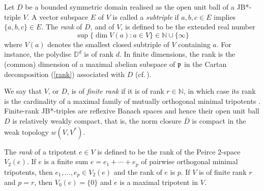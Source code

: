 \documentclass[12pt, twoside]{article}
\theoremstyle{definition}
\numberwithin{equation}{section}
\begin{document}
Let $D$ be a bounded symmetric domain realised as the open unit ball of a JB*-triple $V$.
A vector subspace  $E$ of $V$ is called a {\it subtriple} if $a,b,c \in E$ implies
$\{a,b,c\} \in E$. The {\it rank} of $D$,
and of $V$, is defined to be the extended real number
$$\sup\{ \dim V(a): a\in V\} \in \mathbb{N}\cup \{\infty\}$$
where $V(a)$ denotes the smallest closed subtriple of $V$ containing $a$.
For instance, the polydisc $\mathbb{D}^d$ is of rank $d$.
In finite dimensions,
the rank is the (common) dimension of a maximal abelian subspace of $\frak p$ in the Cartan decomposition
(\ref{rank}) associated with $D$ (cf.\,\cite[p.\,185]{book2}).

We say that $V$, or $D$, is of {\it finite rank} if it is of rank $r \in \mathbb{N}$, in which case its rank is the cardinality of a maximal  family of
mutually orthogonal minimal tripotents \cite[p.\,187]{book2}. Finite-rank JB*-triples are reflexive Banach spaces
\cite[Theorem 3.3.5]{book2} and hence their open unit ball $D$ is relatively weakly compact, that is,
the norm closure $\overline D$ is compact in the weak topology $w(V,V^*)$.

The {\it rank} of a tripotent $e\in V$ is defined to be the rank
of the Peirce 2-space $V_2(e)$. If $e$ is a finite sum $ e=e_1 + \cdots +e_p$ of pairwise orthogonal minimal tripotents,
then $e_1, \ldots, e_p \in V_2(e)$ and the rank of $e$ is $p$.
If $V$ is of finite rank $r$ and $p=r$, then  $V_0(e) =\{0\}$ and
$e$ is a maximal tripotent in $V$.
\end{document}
